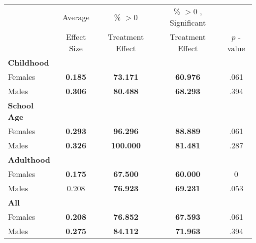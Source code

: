 \begin{tabular}{l c c c c}
\toprule
 & Average & \% $ >0 $ & \% $ >0 $ , Significant & \citet{Rosenbaum_2005_Distribution_JRSS} \\
 & Effect Size & Treatment Effect & Treatment Effect & $ p $ -value \\
\midrule
\textbf{Childhood} & & & & \\
\quad Females &  \textbf{    0.185} & \textbf{   73.171} & \textbf{   60.976} & .061 \\
\quad Males &  \textbf{    0.306} & \textbf{   80.488} & \textbf{   68.293} & .394 \\
\midrule
\textbf{School Age} & & & & \\
\quad Females &  \textbf{    0.293} & \textbf{   96.296} & \textbf{   88.889} & .061 \\
\quad Males &  \textbf{    0.326} & \textbf{  100.000} & \textbf{   81.481} & .287 \\
\midrule
\textbf{Adulthood} & & & & \\
\quad Females &  \textbf{    0.175} & \textbf{   67.500} & \textbf{   60.000} & 0 \\
\quad Males &      0.208 & \textbf{   76.923} & \textbf{   69.231} & .053 \\
\midrule
\textbf{All} & & & & \\
\quad Females &  \textbf{    0.208} & \textbf{   76.852} & \textbf{   67.593} & .061 \\
\quad Males &  \textbf{    0.275} & \textbf{   84.112} & \textbf{   71.963} & .394 \\
\bottomrule
\end{tabular}

